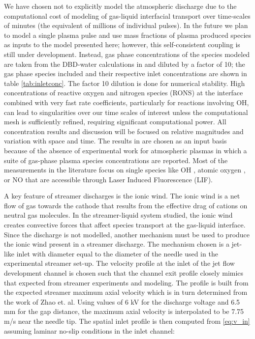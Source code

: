 We have chosen not to explicitly model the atmospheric discharge due to the computational cost of modeling of gas-liquid interfacial transport over time-scales of minutes (the equivalent of millions of individual pulses). In the future we plan to model a single plasma pulse and use mass fractions of plasma produced species as inputs to the model presented here; however, this self-consistent coupling is still under development. Instead, gas phase concentrations of the species modeled are taken from the DBD-water calculations in \cite{Tian2014} and diluted by a factor of 10; the gas phase species included and their respective inlet concentrations are shown in table \ref{tab:inletconc}. The factor 10 dilution is done for numerical stability.  High concentrations of reactive oxygen and nitrogen species (RONS) at the interface combined with very fast rate coefficients, particularly for reactions involving OH, can lead to singularities over our time scales of interest unless the computational mesh is sufficiently refined, requiring significant computational power. All concentration results and discussion will be focused on relative magnitudes and variation with space and time. The results in \cite{Tian2014} are chosen as an input basis because of the absence of experimental work for atmospheric plasmas in which a suite of gas-phase plasma species concentrations are reported. Most of the measurements in the literature focus on single species like OH \cite{ono1998measurement,ono2001oh,nakagawa2011density,verreycken2012time}, atomic oxygen \cite{niemi2005absolute}, or NO \cite{kanazawa2003two} that are accessible through Laser Induced Fluorescence (LIF).

A key feature of streamer discharges is the ionic wind. The ionic wind is a net flow of gas towards the cathode that results from the effective drag of cations on neutral gas molecules. In the streamer-liquid system studied, the ionic wind creates convective forces that affect species transport at the gas-liquid interface. Since the discharge is not modelled, another mechanism must be used to produce the ionic wind present in a streamer discharge. The mechanism chosen is a jet-like inlet with diameter equal to the diameter of the needle used in the experimental streamer set-up. The velocity profile at the inlet of the jet flow development channel is chosen such that the channel exit profile closely mimics that expected from streamer experiments and modeling. \cite{Zhao2005a} The profile is built from the expected streamer maximum axial velocity which is in turn determined from the work of Zhao et. al. Using values of 6 kV for the discharge voltage and 6.5 mm for the gap distance, the maximum axial velocity is interpolated to be 7.75 m/s near the needle tip. The spatial inlet profile is then computed from \cref{eq:v_in} assuming laminar no-slip conditions in the inlet channel: \cite{bird2007transport}

